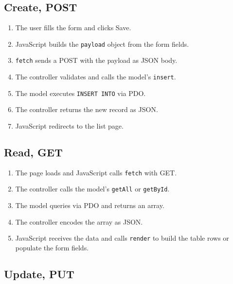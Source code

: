\documentclass[11pt,a4paper,oneside]{book}
\providecommand{\tightlist}{%
  \setlength{\itemsep}{0pt}\setlength{\parskip}{0pt}}
\begin{document}
\hypertarget{create-post}{%
\subsection{Create, POST}\label{create-post}}

\begin{enumerate}
\def\labelenumi{\arabic{enumi}.}
\tightlist
\item
  The user fills the form and clicks Save.
\item
  JavaScript builds the \texttt{payload} object from the form
  fields.
\item
  \texttt{fetch} sends a POST with the payload as JSON body.
\item
  The controller validates and calls the model's \texttt{insert}.
\item
  The model executes \texttt{INSERT\ INTO} via PDO.
\item
  The controller returns the new record as JSON.
\item
  JavaScript redirects to the list page.
\end{enumerate}

\hypertarget{read-get}{%
\subsection{Read, GET}\label{read-get}}

\begin{enumerate}
\def\labelenumi{\arabic{enumi}.}
\tightlist
\item
  The page loads and JavaScript calls \texttt{fetch} with GET.
\item
  The controller calls the model's \texttt{getAll} or
  \texttt{getById}.
\item
  The model queries via PDO and returns an array.
\item
  The controller encodes the array as JSON.
\item
  JavaScript receives the data and calls \texttt{render} to build
  the table rows or populate the form fields.
\end{enumerate}

\hypertarget{update-put}{%
\subsection{Update, PUT}\label{update-put}}
\end{document}
